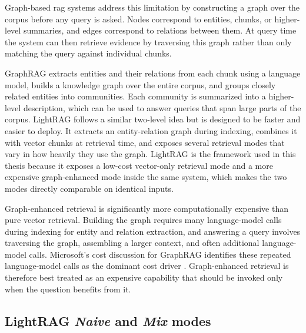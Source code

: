 \documentclass[english, bibtex]{kththesis}               %
\numberwithin{listing}{chapter}
\begin{document}
Graph-based \gls{rag} systems address this limitation by constructing a graph over the corpus before any query is asked. Nodes correspond to entities, chunks, or higher-level summaries, and edges correspond to relations between them. At query time the system can then retrieve evidence by traversing this graph rather than only matching the query against individual chunks.

GraphRAG \cite{edge2024graphrag} extracts entities and their relations from each chunk using a language model, builds a knowledge graph over the entire corpus, and groups closely related entities into communities. Each community is summarized into a higher-level description, which can be used to answer queries that span large parts of the corpus. LightRAG \cite{lightrag2024} follows a similar two-level idea but is designed to be faster and easier to deploy. It extracts an entity-relation graph during indexing, combines it with vector chunks at retrieval time, and exposes several retrieval modes that vary in how heavily they use the graph. LightRAG is the framework used in this thesis because it exposes a low-cost vector-only retrieval mode and a more expensive graph-enhanced mode inside the same system, which makes the two modes directly comparable on identical inputs.

Graph-enhanced retrieval is significantly more computationally expensive than pure vector retrieval. Building the graph requires many language-model calls during indexing for entity and relation extraction, and answering a query involves traversing the graph, assembling a larger context, and often additional language-model calls. Microsoft's cost discussion for GraphRAG identifies these repeated language-model calls as the dominant cost driver \cite{edge2024graphrag,microsoft2024graphragcosts}. Graph-enhanced retrieval is therefore best treated as an expensive capability that should be invoked only when the question benefits from it.

\subsection{LightRAG \emph{Naive} and \emph{Mix} modes}
\label{sec:backgroundLightragModes}
\end{document}

